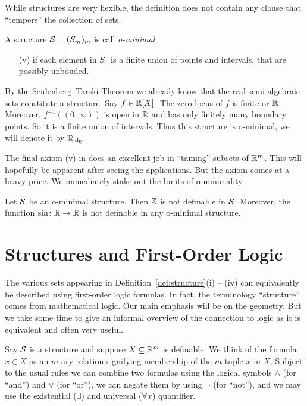 While structures are very flexible, the definition does not contain
any clause that ``tempers'' the collection of sets.

\begin{definition}
  A {structure} ${\mathcal S}=(S_m)_m$ is call \emph{o-minimal}
  \begin{enumerate}
  \item [(v)]  if each 
  element in $S_1$ is a finite union of points and
  intervals, that are possibly unbouded.
  \end{enumerate}
\end{definition}

\begin{example}
  By the Seidenberg--Tarski Theorem we already know that the real
  semi-algebraic sets constitute a structure. Say $f\in{\mathbb{R}}[X]$.
  The zero locus of $f$ is finite or ${\mathbb{R}}$. Moreover,
  $f^{-1}((0,\infty))$ is open in ${\mathbb{R}}$ and has only finitely many
  boundary points. So it is a finite union of intervals. Thus this
  structure is o-minimal, we will denote it by ${\mathbb{R}}_{\mathrm{alg}}$. 
\end{example}

The final axiom (v) in does an excellent job in ``taming'' subsets of
${\mathbb{R}}^m$. This will hopefully be apparent after seeing the
applications. But the axiom comes at a heavy price.
We immediately stake out the limits of o-minimality.

\begin{nonexample}
  Let ${\mathcal S}$ be an o-minimal structure. Then ${\mathbb{Z}}$ is not definable in
  ${\mathcal S}$. Moreover, the function $\sin \colon{\mathbb{R}}\rightarrow{\mathbb{R}}$
  is not definable in any o-minimal structure.  
\end{nonexample}

\section{Structures and First-Order Logic}

The various sets appearing in Definition~\ref{def:structure}(i) --
(iv) can equivalently be described using first-order logic formulas. In fact, the
terminology ``structure'' comes from mathematical logic. Our main
emphasis will be on the geometry.  But we  take some time to give
an informal overview of the connection to logic as it is equivalent
and often very useful. 

Say ${\mathcal S}$ is a structure and suppose $X\subseteq{\mathbb{R}}^m$ is definable.
We think of the formula $x\in X$ as an $m$-ary relation signifying
membership of the $m$-tuple $x$ in $X$. Subject to the usual rules we
can combine two formulas using the logical symbols $\wedge$ (for
``and'') and $\vee$ (for ``or''), we can negate them by using $\neg$
(for ``not''), and we may use the existential ($\exists$) and
universal ($\forall x$) quantifier.

